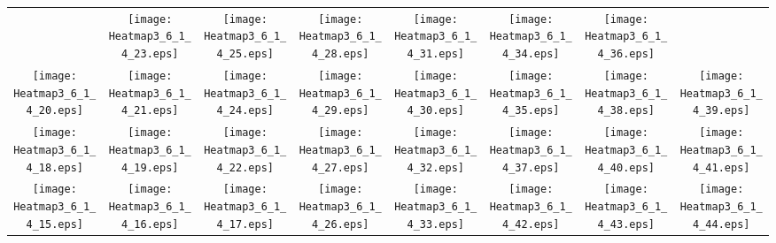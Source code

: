 \documentclass{standalone}
\begin{document}
\renewcommand{\arraystretch}{0}
\setlength{\tabcolsep}{0pt}
\begin{tabular}{ *8{c} }
 & \texttt{[image: Heatmap3\_6\_1\_4\_23.eps]} & \texttt{[image: Heatmap3\_6\_1\_4\_25.eps]} & \texttt{[image: Heatmap3\_6\_1\_4\_28.eps]} & \texttt{[image: Heatmap3\_6\_1\_4\_31.eps]} & \texttt{[image: Heatmap3\_6\_1\_4\_34.eps]} & \texttt{[image: Heatmap3\_6\_1\_4\_36.eps]} &  \\
\texttt{[image: Heatmap3\_6\_1\_4\_20.eps]} & \texttt{[image: Heatmap3\_6\_1\_4\_21.eps]} & \texttt{[image: Heatmap3\_6\_1\_4\_24.eps]} & \texttt{[image: Heatmap3\_6\_1\_4\_29.eps]} & \texttt{[image: Heatmap3\_6\_1\_4\_30.eps]} & \texttt{[image: Heatmap3\_6\_1\_4\_35.eps]} & \texttt{[image: Heatmap3\_6\_1\_4\_38.eps]} & \texttt{[image: Heatmap3\_6\_1\_4\_39.eps]} \\
\texttt{[image: Heatmap3\_6\_1\_4\_18.eps]} & \texttt{[image: Heatmap3\_6\_1\_4\_19.eps]} & \texttt{[image: Heatmap3\_6\_1\_4\_22.eps]} & \texttt{[image: Heatmap3\_6\_1\_4\_27.eps]} & \texttt{[image: Heatmap3\_6\_1\_4\_32.eps]} & \texttt{[image: Heatmap3\_6\_1\_4\_37.eps]} & \texttt{[image: Heatmap3\_6\_1\_4\_40.eps]} & \texttt{[image: Heatmap3\_6\_1\_4\_41.eps]} \\
\texttt{[image: Heatmap3\_6\_1\_4\_15.eps]} & \texttt{[image: Heatmap3\_6\_1\_4\_16.eps]} & \texttt{[image: Heatmap3\_6\_1\_4\_17.eps]} & \texttt{[image: Heatmap3\_6\_1\_4\_26.eps]} & \texttt{[image: Heatmap3\_6\_1\_4\_33.eps]} & \texttt{[image: Heatmap3\_6\_1\_4\_42.eps]} & \texttt{[image: Heatmap3\_6\_1\_4\_43.eps]} & \texttt{[image: Heatmap3\_6\_1\_4\_44.eps]} \\

\end{tabular}
\end{document}
